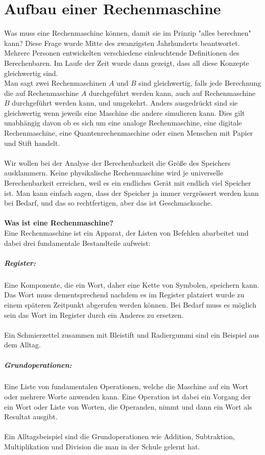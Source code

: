 \documentclass[11pt,a4paper,leqno]{report}
\numberwithin{equation}{chapter}
\begin{document}
\chapter{Aufbau einer Rechenmaschine}
Was muss eine Rechenmaschine k\"onnen, damit sie im Prinzip "alles berechnen" kann?
Diese Frage wurde Mitte des zwanzigsten Jahrhunderts beantwortet. Mehrere Personen entwickelten verschiedene einleuchtende Definitionen des Berechenbaren. Im Laufe der Zeit wurde dann gezeigt, dass all diese Konzepte gleichwertig sind.\\
Man sagt zwei Rechenmaschinen $A$ und $B$ sind gleichwertig, falls jede Berechnung die auf Rechenmaschine $A$ durchgef\"uhrt werden kann, auch auf Rechenmaschine $B$ durchgef\"uhrt werden kann, und umgekehrt.
Anders ausgedr\"uckt sind sie gleichwertig wenn jeweils eine Maschine die andere simulieren kann. Dies gilt unabh\"angig davon ob es sich um eine analoge Rechenmaschine, eine digitale Rechenmaschine, eine Quantenrechenmaschine oder einen Menschen mit Papier und Stift handelt.\\
\\
Wir wollen bei der Analyse der Berechenbarkeit die Gr\"o\ss{}e des Speichers ausklammern. Keine physikalische Rechenmaschine wird je universelle Berechenbarkeit erreichen, weil es ein endliches Ger\"at mit endlich viel Speicher ist. Man kann einfach sagen, dass der Speicher ja immer vergr\"ossert werden kann bei Bedarf, und das so rechtfertigen, aber das ist Geschmacksache.\\
\\
\textbf{Was ist eine Rechenmaschine?}\\
Eine Rechenmaschine ist ein Apparat, der Listen von Befehlen abarbeitet und dabei drei fundamentale Bestandteile aufweist:
\paragraph{Register:} Eine Komponente, die ein Wort, daher eine Kette von Symbolen, speichern kann. Das Wort muss dementsprechend nachdem es im Register platziert wurde zu einem sp\"ateren Zeitpunkt abgerufen werden k\"onnen. Bei Bedarf muss es m\"oglich sein das Wort im Register durch ein Anderes zu ersetzen.\\
\\
Ein Schmierzettel zusammen mit Bleistift und Radiergummi sind ein Beispiel aus dem Alltag.
\paragraph{Grundoperationen:} Eine Liste von fundamentalen Operationen, welche die Maschine auf ein Wort oder mehrere Worte anwenden kann. Eine Operation ist dabei ein Vorgang der ein Wort oder Liste von Worten, die Operanden, nimmt und dann ein Wort als Resultat ausgibt.\\
\\
Ein Alltagsbeispiel sind die Grundoperationen wie Addition, Subtraktion, Multiplikation und Division die man in der Schule gelernt hat.
\end{document}
